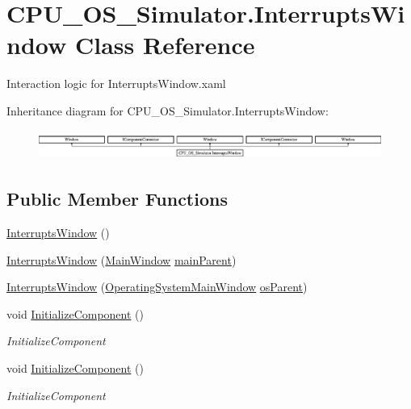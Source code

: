 \hypertarget{class_c_p_u___o_s___simulator_1_1_interrupts_window}{}\section{C\+P\+U\+\_\+\+O\+S\+\_\+\+Simulator.\+Interrupts\+Window Class Reference}
\label{class_c_p_u___o_s___simulator_1_1_interrupts_window}


Interaction logic for Interrupts\+Window.\+xaml  


Inheritance diagram for C\+P\+U\+\_\+\+O\+S\+\_\+\+Simulator.\+Interrupts\+Window\+:\begin{figure}[H]
\begin{center}
\leavevmode
\includegraphics[height=0.973913cm]{class_c_p_u___o_s___simulator_1_1_interrupts_window}
\end{center}
\end{figure}
\subsection*{Public Member Functions}
\begin{DoxyCompactItemize}
\item 
\hyperlink{class_c_p_u___o_s___simulator_1_1_interrupts_window_a360799e70107b3846ddc55d27f7e1431}{Interrupts\+Window} ()
\item 
\hyperlink{class_c_p_u___o_s___simulator_1_1_interrupts_window_a9f3d8a58a24e39b92e8a47539beb5f71}{Interrupts\+Window} (\hyperlink{class_c_p_u___o_s___simulator_1_1_main_window}{Main\+Window} \hyperlink{class_c_p_u___o_s___simulator_1_1_interrupts_window_a0ea0428513dececf5a6c60ee8e01948c}{main\+Parent})
\item 
\hyperlink{class_c_p_u___o_s___simulator_1_1_interrupts_window_a7d31a0da4510642729ca7578bd30085c}{Interrupts\+Window} (\hyperlink{class_c_p_u___o_s___simulator_1_1_operating_system_main_window}{Operating\+System\+Main\+Window} \hyperlink{class_c_p_u___o_s___simulator_1_1_interrupts_window_adeffa97feb88b4516257067431ebf28d}{os\+Parent})
\item 
void \hyperlink{class_c_p_u___o_s___simulator_1_1_interrupts_window_acca298ec071471610c001150621b3728}{Initialize\+Component} ()
\begin{DoxyCompactList}\small\item\em Initialize\+Component \end{DoxyCompactList}\item 
void \hyperlink{class_c_p_u___o_s___simulator_1_1_interrupts_window_acca298ec071471610c001150621b3728}{Initialize\+Component} ()
\begin{DoxyCompactList}\small\item\em Initialize\+Component \end{DoxyCompactList}\end{DoxyCompactItemize}
